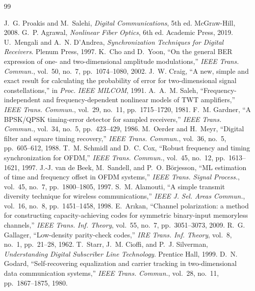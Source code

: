 \begin{thebibliography}{99}

 J.~G. Proakis and M.~Salehi, \emph{Digital Communications}, 5th ed. McGraw-Hill, 2008.
 G.~P. Agrawal, \emph{Nonlinear Fiber Optics}, 6th ed. Academic Press, 2019.
 U.~Mengali and A.~N. D'Andrea, \emph{Synchronization Techniques for Digital Receivers}. Plenum Press, 1997.
 K.~Cho and D.~Yoon, ``On the general BER expression of one- and two-dimensional amplitude modulations,'' \emph{IEEE Trans. Commun.}, vol.~50, no.~7, pp.~1074--1080, 2002.
 J.~W. Craig, ``A new, simple and exact result for calculating the probability of error for two-dimensional signal constellations,'' in \emph{Proc. IEEE MILCOM}, 1991.
 A.~A.~M. Saleh, ``Frequency-independent and frequency-dependent nonlinear models of TWT amplifiers,'' \emph{IEEE Trans. Commun.}, vol.~29, no.~11, pp.~1715--1720, 1981.
 F.~M. Gardner, ``A BPSK/QPSK timing-error detector for sampled receivers,'' \emph{IEEE Trans. Commun.}, vol.~34, no.~5, pp.~423--429, 1986.
 M.~Oerder and H.~Meyr, ``Digital filter and square timing recovery,'' \emph{IEEE Trans. Commun.}, vol.~36, no.~5, pp.~605--612, 1988.
 T.~M. Schmidl and D.~C. Cox, ``Robust frequency and timing synchronization for OFDM,'' \emph{IEEE Trans. Commun.}, vol.~45, no.~12, pp.~1613--1621, 1997.
 J.-J. van de Beek, M.~Sandell, and P.~O. Börjesson, ``ML estimation of time and frequency offset in OFDM systems,'' \emph{IEEE Trans. Signal Process.}, vol.~45, no.~7, pp.~1800--1805, 1997.
 S.~M. Alamouti, ``A simple transmit diversity technique for wireless communications,'' \emph{IEEE J. Sel. Areas Commun.}, vol.~16, no.~8, pp.~1451--1458, 1998.
 E.~Arıkan, ``Channel polarization: a method for constructing capacity-achieving codes for symmetric binary-input memoryless channels,'' \emph{IEEE Trans. Inf. Theory}, vol.~55, no.~7, pp.~3051--3073, 2009.
 R.~G. Gallager, ``Low-density parity-check codes,'' \emph{IRE Trans. Inf. Theory}, vol.~8, no.~1, pp.~21--28, 1962.
 T.~Starr, J.~M. Cioffi, and P.~J. Silverman, \emph{Understanding Digital Subscriber Line Technology}. Prentice Hall, 1999.
 D.~N. Godard, ``Self-recovering equalization and carrier tracking in two-dimensional data communication systems,'' \emph{IEEE Trans. Commun.}, vol.~28, no.~11, pp.~1867--1875, 1980.

\end{thebibliography}

